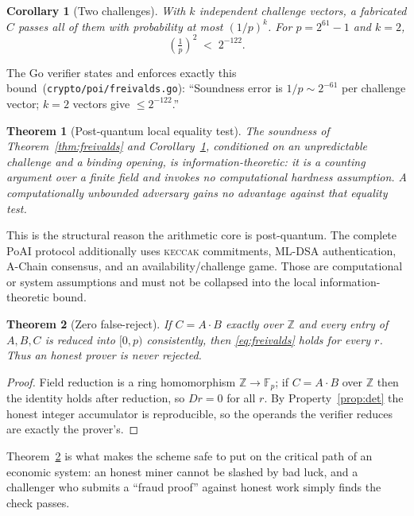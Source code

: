\documentclass[11pt,a4paper]{article}
\newtheorem{theorem}{Theorem}
\newtheorem{corollary}{Corollary}
\begin{document}
\begin{corollary}[Two challenges]\label{cor:two}
With $k$ independent challenge vectors, a fabricated $C$ passes all of them with probability at most $(1/p)^k$. For $p = 2^{61}-1$ and $k = 2$,
\[
  \left(\tfrac{1}{p}\right)^2 \;<\; 2^{-122}.
\]
\end{corollary}

The Go verifier states and enforces exactly this bound~(\texttt{crypto/poi/freivalds.go}): ``Soundness error is $1/p \sim 2^{-61}$ per challenge vector; $k=2$ vectors give $\le 2^{-122}$.''

\begin{theorem}[Post-quantum local equality test]\label{thm:pq}
The soundness of Theorem~\ref{thm:freivalds} and Corollary~\ref{cor:two}, conditioned on an unpredictable challenge and a binding opening, is information-theoretic: it is a counting argument over a finite field and invokes no computational hardness assumption. A computationally unbounded adversary gains no advantage against that equality test.
\end{theorem}

This is the structural reason the arithmetic core is post-quantum. The complete PoAI protocol additionally uses \textsc{keccak} commitments, ML-DSA authentication, A-Chain consensus, and an availability/challenge game. Those are computational or system assumptions and must not be collapsed into the local information-theoretic bound.

\begin{theorem}[Zero false-reject]\label{thm:zero-fr}
If $C = A \cdot B$ exactly over $\mathbb{Z}$ and every entry of $A, B, C$ is reduced into $[0,p)$ consistently, then \eqref{eq:freivalds} holds for \emph{every} $r$. Thus an honest prover is never rejected.
\end{theorem}

\begin{proof}
Field reduction is a ring homomorphism $\mathbb{Z} \to \mathbb{F}_p$; if $C = A \cdot B$ over $\mathbb{Z}$ then the identity holds after reduction, so $Dr = 0$ for all $r$. By Property~\ref{prop:det} the honest integer accumulator is reproducible, so the operands the verifier reduces are exactly the prover's.
\end{proof}

Theorem~\ref{thm:zero-fr} is what makes the scheme safe to put on the critical path of an economic system: an honest miner cannot be slashed by bad luck, and a challenger who submits a ``fraud proof'' against honest work simply finds the check passes.
\end{document}
